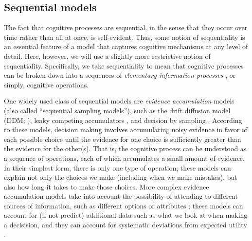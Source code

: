 \subsection{Sequential models}

The fact that cognitive processes are sequential, in the sense that they occur over time rather than all at once, is self-evident. Thus, some notion of sequentiality is an essential feature of a model that captures cognitive mechanisms at any level of detail. Here, however, we will use a slightly more restrictive notion of sequentiality. Specifically, we take sequentiality to mean that cognitive processes can be broken down into a sequences of \emph{elementary information processes} \citep{simon1979information,posner1982information,chase1978elementary}, or simply, cognitive operations.

One widely used class of sequential models are \emph{evidence accumulation} models (also called ``sequential sampling models''), such as the drift diffusion model (DDM; \citealp{ratcliff1978theory}), leaky competing accumulators \citep{usher2001time}, and decision by sampling \citep{stewart2006decision}. According to these models, decision making involves accumulating noisy evidence in favor of each possible choice until the evidence for one choice is sufficiently greater than the evidence for the other(s). That is, the cognitive process can be understood as a sequence of operations, each of which accumulates a small amount of evidence. In their simplest form, there is only one type of operation; these models can explain not only the choices we make (including when we make mistakes), but also how long it takes to make those choices. More complex evidence accumulation models take into account the possibility of attending to different sources of information, such as different options \citep{krajbich2010visual} or attributes \citep{russo1983strategies}; these models can account for (if not predict) additional data such as what we look at when making a decisision, and they can account for systematic deviations from expected utility \citep{busemeyer2019cognitive}.

